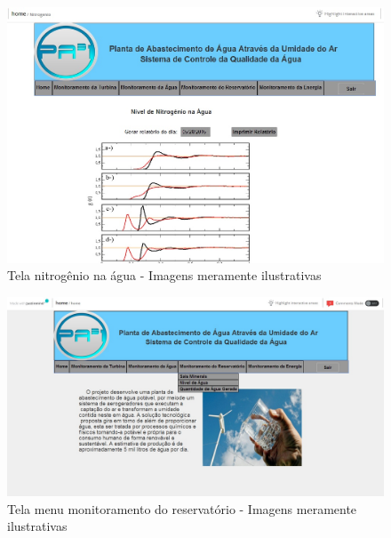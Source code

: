 \begin{center}
\begin{figure}[!ht]
\centering
\includegraphics[scale=0.5]{figuras/10}
\caption[Tela nitrogênio na água]{Tela nitrogênio na água - Imagens meramente ilustrativas}
\label{tela_nitrogenio_na_agua}
\end{figure}
\clearpage

\begin{figure}[!ht]
\centering
\includegraphics[scale=0.45]{figuras/menu_monitoramento_do_reservatorio}
\caption[Tela menu monitoramento do reservatório]{Tela menu monitoramento do reservatório - Imagens meramente ilustrativas}
\label{menu_monitoramento_do_reservatorio}
\end{figure}
\clearpage


\end{center}
